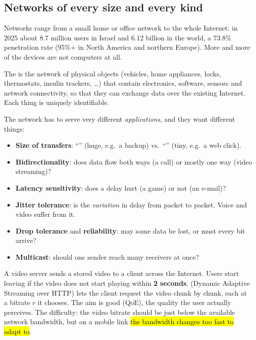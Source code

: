 \subsection{Networks of every size and every kind}

Networks range from a small home or office network to the whole Internet: in 2025 about 8.7 million users in Israel and 6.12 billion in the
world, a 73.8\% penetration rate (95\%+ in North America and northern Europe). More and more of the devices are not computers at all.

\begin{defn}
The  is the network of physical objects (vehicles, home appliances, locks, thermostats, insulin trackers, \dots) that
contain electronics, software, sensors and network connectivity, so that they can exchange data over the existing Internet. Each thing is uniquely identifiable.
\end{defn}

The network has to serve very different \emph{applications}, and they want different things:
\begin{defn}
\begin{itemize}
  \item \textbf{Size of transfers}: ``'' (huge, e.g.\ a backup) vs.\ ``'' (tiny, e.g.\ a web click).
  \item \textbf{Bidirectionality}: does data flow both ways (a call) or mostly one way (video streaming)?
  \item \textbf{Latency sensitivity}: does a delay hurt (a game) or not (an e-mail)?
  \item \textbf{Jitter tolerance}:  is the \emph{variation} in delay from packet to packet. Voice and video suffer from it.
  \item \textbf{Drop tolerance} and \textbf{reliability}: may some data be lost, or must every bit arrive?
  \item \textbf{Multicast}: should one sender reach many receivers at once?
\end{itemize}
\end{defn}

\begin{example}
A video server sends a stored video to a client across the Internet. Users start leaving if the video does not start playing within \textbf{2 seconds}.
 (Dynamic Adaptive Streaming over HTTP) lets the client request the video chunk by chunk, each at a bitrate $r$ it chooses. The aim is good
 (QoE), the quality the user actually perceives. The difficulty: the video bitrate should be just below the available
network bandwidth, but on a mobile link \hl{the bandwidth changes too fast to adapt to}.
\end{example}

